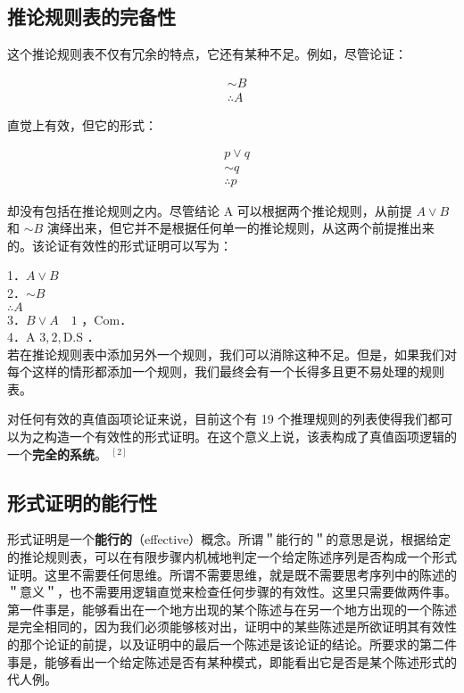 \subsection{推论规则表的完备性}

这个推论规则表不仅有冗余的特点，它还有某种不足。例如，尽管论证：

$$
\begin{aligned}
& \sim B \\
& \therefore A
\end{aligned}
$$

直觉上有效，但它的形式：

$$
\begin{aligned}
& p \vee q \\
& \sim q \\
& \therefore p
\end{aligned}
$$

却没有包括在推论规则之内。尽管结论 A 可以根据两个推论规则，从前提 $A \vee B$ 和 $\sim B$ 演绎出来，但它并不是根据任何单一的推论规则，从这两个前提推出来的。该论证有效性的形式证明可以写为：

1．$A \vee B$\\
2．$\sim B$\\
$\therefore A$\\
3．$B \vee A \quad 1$ ，Com．\\
4．A $3,2, \mathrm{D} . \mathrm{S}$ ．\\
若在推论规则表中添加另外一个规则，我们可以消除这种不足。但是，如果我们对每个这样的情形都添加一个规则，我们最终会有一个长得多且更不易处理的规则表。

对任何有效的真值函项论证来说，目前这个有 19 个推理规则的列表使得我们都可以为之构造一个有效性的形式证明。在这个意义上说，该表构成了真值函项逻辑的一个\textbf{完全的系统}。 ${ }^{[2]}$

\subsection{形式证明的能行性}

形式证明是一个\textbf{能行的}（effective）概念。所谓＂能行的＂的意思是说，根据给定的推论规则表，可以在有限步骤内机械地判定一个给定陈述序列是否构成一个形式证明。这里不需要任何思维。所谓不需要思维，就是既不需要思考序列中的陈述的＂意义＂，也不需要用逻辑直觉来检查任何步骤的有效性。这里只需要做两件事。第一件事是，能够看出在一个地方出现的某个陈述与在另一个地方出现的一个陈述是完全相同的，因为我们必须能够核对出，证明中的某些陈述是所欲证明其有效性的那个论证的前提，以及证明中的最后一个陈述是该论证的结论。所要求的第二件事是，能够看出一个给定陈述是否有某种模式，即能看出它是否是某个陈述形式的代人例。

